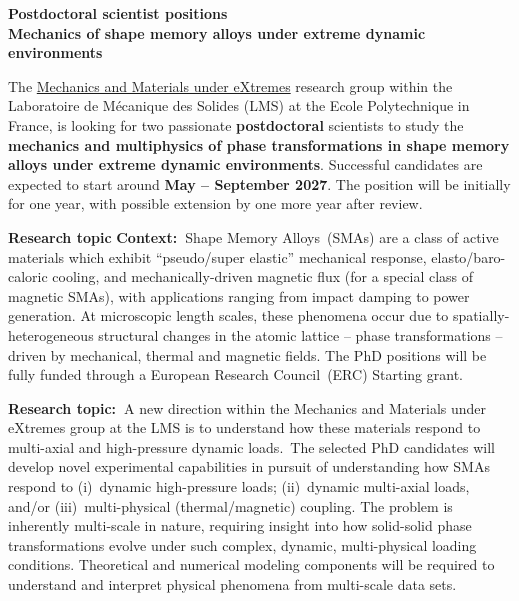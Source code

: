 \documentclass[a4paper,11pt,fleqn]{article}
\begin{document}
	\setlength{\abovedisplayskip}{2 pt}
	\setlength{\belowdisplayskip}{2 pt}
	\sffamily
	\thispagestyle{titlepage}
	\begin{center}
		\vspace*{0em}
		\Large \textbf{Postdoctoral scientist positions \\ Mechanics of shape memory alloys under extreme dynamic environments} 
	\end{center}
	
	The \href{https://vigneshkannan-group.github.io/vk-mxm-website/}{Mechanics and Materials under eXtremes} research group within the Laboratoire de M{\'e}canique des Solides (LMS) at the Ecole Polytechnique in France, is looking for two passionate \textbf{postdoctoral} scientists to study the \textbf{mechanics and multiphysics of phase transformations in shape memory alloys under extreme dynamic environments}. Successful candidates are expected to start around \textbf{May -- September 2027}. The position will be initially for one year, with possible extension by one more year after review.

	\begin{myhlbox}{\textbf{Research topic}}
		\textbf{Context:~}Shape Memory Alloys~(SMAs) are a class of active materials which exhibit ``pseudo/super elastic'' mechanical response, elasto/baro-caloric cooling, and mechanically-driven magnetic flux (for a special class of magnetic SMAs), with applications ranging from impact damping to power generation. At microscopic length scales, these phenomena occur due to spatially-heterogeneous structural changes in the atomic lattice -- phase transformations -- driven by mechanical, thermal and magnetic fields. The PhD positions will be fully funded through a European Research Council~(ERC) Starting grant. 
		
		\textbf{Research topic:~}A new direction within the Mechanics and Materials under eXtremes group at the LMS is to understand how these materials respond to multi-axial and high-pressure dynamic loads.~The selected PhD candidates will develop novel experimental capabilities in pursuit of understanding how SMAs respond to (i)~dynamic high-pressure loads; (ii)~dynamic multi-axial loads, and/or (iii)~multi-physical (thermal/magnetic) coupling. The problem is inherently multi-scale in nature, requiring insight into how solid-solid phase transformations evolve under such complex, dynamic, multi-physical loading conditions. Theoretical and numerical modeling components will be required to understand and interpret physical phenomena from multi-scale data sets. 
	
	\end{myhlbox}
	
\end{document}
